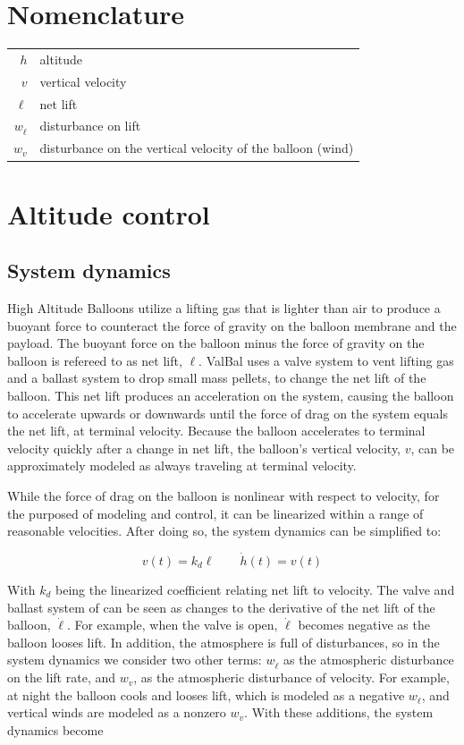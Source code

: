 \documentclass[11pt]{scrartcl} %
\begin{document}
\newcommand{\cf}{{\it cf.}}
\newcommand{\eg}{{\it e.g.}}
\newcommand{\ie}{{\it i.e.}}
\newcommand{\etc}{{\it etc.}}

\tableofcontents

\section*{Nomenclature}
\begin{tabular}{rl}
$h$ & altitude  \\
$v$ & vertical velocity\\
$\ell$ & net lift \\
$w_{\dot \ell}$ & disturbance on lift \\
$w_{v}$ & disturbance on the vertical velocity of the balloon (wind) \\
\end{tabular}

\section{Altitude control}
\subsection{System dynamics}

High Altitude Balloons utilize a lifting gas that is lighter than air to produce a buoyant force to counteract the force of gravity on the balloon membrane and the payload. The buoyant force on the balloon minus the force of gravity on the balloon is refereed to as net lift, $\ell$. ValBal uses a valve system to vent lifting gas and a ballast system to drop small mass pellets, to change the net lift of the balloon. This net lift produces an acceleration on the system, causing the balloon to accelerate upwards or downwards until the force of drag on the system equals the net lift, at terminal velocity. Because the balloon accelerates to terminal velocity quickly after a change in net lift, the balloon's vertical velocity, $v$, can be approximately modeled as always traveling at terminal velocity.

While the force of drag on the balloon is nonlinear with respect to velocity, for the purposed of modeling and control, it can be linearized within a range of reasonable velocities. After doing so, the system dynamics can be simplified to:

\[ v(t) = k_d \ell \qquad \dot h(t) = v(t)\]

With $k_d$ being the linearized coefficient relating net lift to velocity. The valve and ballast system of can be seen as changes to the derivative of the net lift of the balloon, $\dot \ell$. For example, when the valve is open, $\dot \ell$ becomes negative as the balloon looses lift. In addition, the atmosphere is full of disturbances, so in the system dynamics we consider two other terms: $w_{\dot \ell}$ as the atmospheric disturbance on the lift rate, and $w_v$, as the atmospheric disturbance of velocity. For example, at night the balloon cools and looses lift, which is modeled as a negative $w_{\dot \ell}$, and vertical winds are modeled as a nonzero $w_v$. With these additions, the system dynamics become
\end{document}
